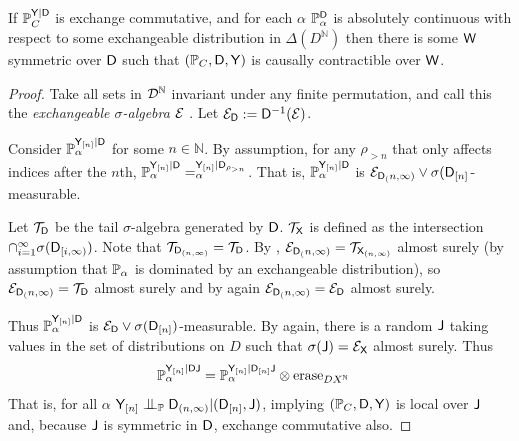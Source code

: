\begin{theorem}\label{lem:exch_prod_ciid}
If $\mathbb{P}_C^{\mathsf{Y}|\mathsf{D}}$ is exchange commutative, and for each $\alpha$ $\mathbb{P}_\alpha^{\mathsf{D}}$ is absolutely continuous with respect to some exchangeable distribution in $\Delta(D^{\mathbb{N}})$ then there is some $\mathsf{W}$ symmetric over $\mathsf{D}$ such that $(\mathbb{P}_C,\mathsf{D},\mathsf{Y})$ is causally contractible over $\mathsf{W}$.
\end{theorem}

\begin{proof}
Take all sets in $\mathcal{D}^{\mathbb{N}}$ invariant under any finite permutation, and call this the \emph{exchangeable $\sigma$-algebra} $\mathcal{E}$ \citep[pg. 29]{kallenberg_basic_2005}. Let $\mathcal{E}_{\mathsf{D}}:=\mathsf{D}^{-1}(\mathcal{E})$.

Consider $\mathbb{P}_\alpha^{\mathsf{Y}_{[n]}|\mathsf{D}}$ for some $n\in \mathbb{N}$. By assumption, for any $\rho_{>n}$ that only affects indices after the $n$th, $\mathbb{P}_\alpha^{\mathsf{Y}_{[n]}|\mathsf{D}}=_\alpha^{\mathsf{Y}_{[n]}|\mathsf{D}_{\rho_{>n}}}$. That is, $\mathbb{P}_\alpha^{\mathsf{Y}_{[n]}|\mathsf{D}}$ is $\mathcal{E}_{\mathsf{D}_(n,\infty)}\vee\sigma(\mathsf{D}_{[n]}$-measurable.

Let $\mathcal{T}_{\mathsf{D}}$ be the tail $\sigma$-algebra generated by $\mathsf{D}$. $\mathcal{T}_{\mathsf{X}}$ is defined as the intersection $\cap_{i=1}^{\infty} \sigma(\mathsf{D}_{[i,\infty)})$. Note that $\mathcal{T}_{\mathsf{D}_{(n,\infty)}}=\mathcal{T}_{\mathsf{D}}$. By \citet[Corollary 1.6]{kallenberg_basic_2005}, $\mathcal{E}_{\mathsf{D}_(n,\infty)}=\mathcal{T}_{\mathsf{X}_{(n,\infty)}}$ almost surely (by assumption that $\mathbb{P}_\alpha$ is dominated by an exchangeable distribution), so $\mathcal{E}_{\mathsf{D}_(n,\infty)}=\mathcal{T}_{\mathsf{D}}$ almost surely and by \citet[Corollary 1.6]{kallenberg_basic_2005} again $\mathcal{E}_{\mathsf{D}_(n,\infty)}=\mathcal{E}_{\mathsf{D}}$ almost surely.

Thus $\mathbb{P}_\alpha^{\mathsf{Y}_{[n]}|\mathsf{D}}$ is $\mathcal{E}_{\mathsf{D}}\vee\sigma(\mathsf{D}_{[n]})$-measurable. By \citet[Corollary 1.6]{kallenberg_basic_2005} again, there is a random $\mathsf{J}$ taking values in the set of distributions on $D$ such that $\sigma(\mathsf{J})=\mathcal{E}_{\mathsf{X}}$ almost surely. Thus
\begin{align}
    \mathbb{P}_\alpha^{\mathsf{Y}_{[n]}|\mathsf{D}\mathsf{J}} &= \mathbb{P}_\alpha^{\mathsf{Y}_{[n]}|\mathsf{D}_{[n]}\mathsf{J}}\otimes \text{erase}_{DX^{\mathbb{N}}}
\end{align}
That is, for all $\alpha$ $\RV{Y}_{[n]}\CI_{\prob{P}} \RV{D}_{(n,\infty)}|(\RV{D}_{[n]},\RV{J})$, implying $(\mathbb{P}_C,\mathsf{D},\mathsf{Y})$ is local over $\mathsf{J}$ and, because $\mathsf{J}$ is symmetric in $\mathsf{D}$, exchange commutative also.
\end{proof}

